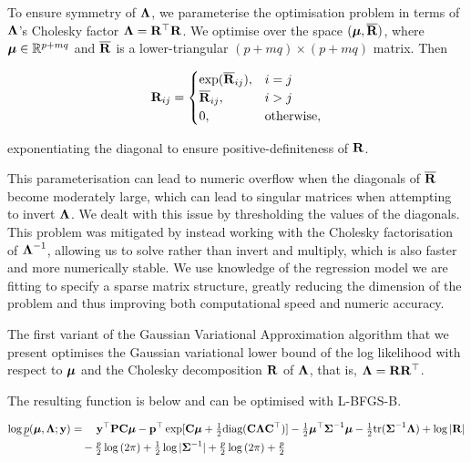 \documentclass[times, doublespace]{anzsauth}
\begin{document}
	\noindent To ensure symmetry of ${\boldsymbol \Lambda}$, we parameterise the optimisation problem in terms of ${\boldsymbol \Lambda}$'s
	Cholesky factor  ${\boldsymbol \Lambda} = {\bf R}^\top {\bf R}$. We optimise over the space $({\boldsymbol \mu}, \overline{{\bf R}})$, where ${\boldsymbol \mu}
	\in {\mathbb{R}}^{p + mq}$ and $\overline{{\bf R}}$ is a lower-triangular $(p + mq) \times (p + mq)$ matrix. Then
		
	\begin{equation*}
		{\bf R}_{ij} =
		\begin{cases}
			\exp(\overline{{\bf R}}_{ij}), & i = j             \\
			\overline{{\bf R}}_{ij},       & i > j             \\
			0,                         & \text{otherwise}, 
		\end{cases}
	\end{equation*}
		
	\noindent exponentiating the diagonal to ensure positive-definiteness of ${\bf R}$.
		
	\noindent This parameterisation can lead to numeric overflow when the diagonals of $\overline{{\bf R}}$ become
	moderately large, which can lead to singular matrices when   attempting to invert ${\boldsymbol \Lambda}$. We dealt with
	this issue by thresholding the values of the diagonals.  This   problem was mitigated by  instead working with
	the Cholesky factorisation of ${\boldsymbol \Lambda}^{-1}$, allowing us to   solve rather than invert and multiply, which
	is also faster and more numerically stable. We use knowledge of   the regression model we are fitting to
	specify a sparse matrix structure, greatly reducing the dimension of   the problem and thus improving both
	computational speed and numeric accuracy.
		
	\noindent The first variant of the Gaussian Variational Approximation algorithm that we present optimises
	the    Gaussian variational lower bound of the log likelihood with respect to ${\boldsymbol \mu}$ and the Cholesky
	decomposition ${\bf R}$ of   ${\boldsymbol \Lambda}$, that is, ${\boldsymbol \Lambda} = {\bf R} {\bf R}^\top$.
	
	The resulting function is below and can be optimised with L-BFGS-B.
		
	\begin{align*}
		\log \underline{p}({\boldsymbol \mu}, {\boldsymbol \Lambda}; {\bf y}) & = \quad {\bf y}^\top{\bf P} {\bf C} {\boldsymbol\mu} - {\bf p}^\top \exp[{\bf C} {\boldsymbol \mu} + \tfrac{1}{2} \text{diag}({\bf C} {\boldsymbol \Lambda} {\bf C}^\top)] - \tfrac{1}{2} {\boldsymbol \mu}^\top {\boldsymbol\Sigma}^{-1} {\boldsymbol \mu} - \tfrac{1}{2} \text{tr}{({\boldsymbol\Sigma}^{-1} {\boldsymbol\Lambda})} + \log{|{\bf R}|} \\
		                                        & \quad - \tfrac{p}{2} \log{(2 \pi)} + \tfrac{1}{2} \log{|{\boldsymbol\Sigma}^{-1}|} + \tfrac{p}{2} \log{(2 \pi)} + \tfrac{p}{2}                                                                              \\
	\end{align*}
		
\end{document}
